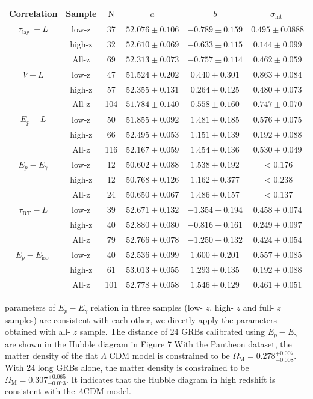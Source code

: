 \documentclass[10pt, a4paper]{article}
\begin{document}
\begin{tabular}{cccccc}
\hline
Correlation & Sample & $\mathrm{N}$ & $a$ & $b$ & $\sigma_{\text {int }}$ \\
\hline
$\tau_{\text {lag }}-L$ & low-z & 37 & $52.076 \pm 0.106$ & $-0.789 \pm 0.159$ & $0.495 \pm 0.0888$ \\
 & high-z & 32 & $52.610 \pm 0.069$ & $-0.633 \pm 0.115$ & $0.144 \pm 0.099$ \\
 & All-z & 69 & $52.313 \pm 0.073$ & $-0.757 \pm 0.114$ & $0.462 \pm 0.059$ \\
\hline
$V-L$ & low-z & 47 & $51.524 \pm 0.202$ & $0.440 \pm 0.301$ & $0.863 \pm 0.084$ \\
 & high-z & 57 & $52.355 \pm 0.131$ & $0.264 \pm 0.125$ & $0.480 \pm 0.073$ \\
 & All-z & 104 & $51.784 \pm 0.140$ & $0.558 \pm 0.160$ & $0.747 \pm 0.070$ \\
\hline
$E_{p}-L$ & low-z & 50 & $51.855 \pm 0.092$ & $1.481 \pm 0.185$ & $0.576 \pm 0.075$ \\
 & high-z & 66 & $52.495 \pm 0.053$ & $1.151 \pm 0.139$ & $0.192 \pm 0.088$ \\
 & All-z & 116 & $52.167 \pm 0.059$ & $1.454 \pm 0.136$ & $0.530 \pm 0.049$ \\
\hline
$E_{p}-E_{\gamma}$ & low-z & 12 & $50.602 \pm 0.088$ & $1.538 \pm 0.192$ & $<0.176$ \\
 & high-z & 12 & $50.768 \pm 0.126$ & $1.162 \pm 0.377$ & $<0.238$ \\
 & All-z & 24 & $50.650 \pm 0.067$ & $1.486 \pm 0.157$ & $<0.137$ \\
\hline
$\tau_{\mathrm{RT}}-L$ & low-z & 39 & $52.671 \pm 0.132$ & $-1.354 \pm 0.194$ & $0.458 \pm 0.074$ \\
 & high-z & 40 & $52.880 \pm 0.080$ & $-0.816 \pm 0.161$ & $0.249 \pm 0.097$ \\
 & All-z & 79 & $52.766 \pm 0.078$ & $-1.250 \pm 0.132$ & $0.424 \pm 0.054$ \\
\hline
$E_{p}-E_{\text {iso }}$ & low-z & 40 & $52.536 \pm 0.099$ & $1.600 \pm 0.201$ & $0.557 \pm 0.085$ \\
 & high-z & 61 & $53.013 \pm 0.055$ & $1.293 \pm 0.135$ & $0.192 \pm 0.088$ \\
 & All-z & 101 & $52.778 \pm 0.058$ & $1.546 \pm 0.129$ & $0.461 \pm 0.051$ \\
\hline
\end{tabular}

parameters of $E_{p}-E_{\gamma}$ relation in three samples (low- $z$, high- $z$ and full- $z$ samples) are consistent with each other, we directly apply the parameters obtained with all- $z$ sample. The distance of 24 GRBs calibrated using $E_{p}-E_{\gamma}$ are shown in the Hubble diagram in Figure 7 With the Pantheon dataset, the matter density of the flat $\Lambda$ CDM model is constrained to be $\Omega_{\mathrm{M}}=0.278_{-0.008}^{+0.007}$. With 24 long GRBs alone, the matter density is constrained to be $\Omega_{\mathrm{M}}=0.307_{-0.073}^{+0.065}$. It indicates that the Hubble diagram in high redshift is consistent with the $\Lambda \mathrm{CDM}$ model.
\end{document}
